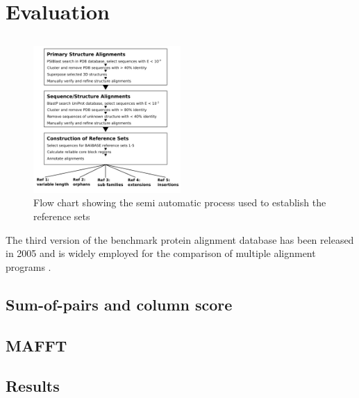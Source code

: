 \chapter{Evaluation}

\section{}
\begin{figure}
	\centering
	\includegraphics[width=0.5\textwidth]{./images/balibase.png}
	\caption{Flow chart showing the semi automatic process used to establish the reference sets}
	\label{fig:balibase}
\end{figure}

The third version of the \bb benchmark protein alignment database has been released in 2005 and is widely employed for the comparison of multiple alignment programs \cite{thompson2005balibase, Russell2016}. 



\section{Sum-of-pairs and column score}

\section{MAFFT}

\section{Results}
